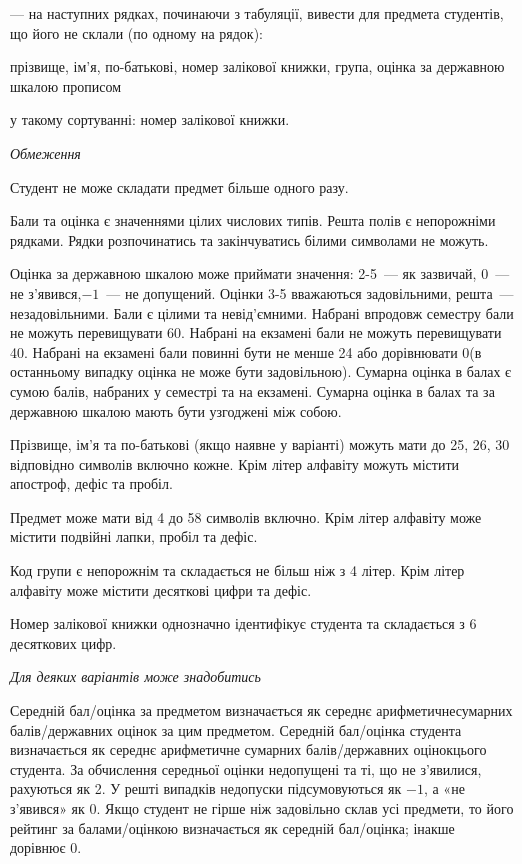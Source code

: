 \documentclass[11pt, ukrainian]{article}
\begin{document}
{\noindent}--- на наступних рядках, починаючи з табуляції, вивести для предмета студентів, що його не склали (по одному на рядок):\par
прізвище, ім’я, по-батькові, номер залікової книжки, група, оцінка за державною шкалою прописом

{\noindent}у такому сортуванні: номер залікової книжки.


\bigskip\textit{Обмеження}

Студент не може складати предмет більше одного разу.

Бали та оцінка є значеннями цілих числових типів. Решта полів є непорожніми рядками.
Рядки розпочинатись та закінчуватись білими символами не можуть.

Оцінка за державною шкалою може приймати значення: 2-5~--- як зазвичай, 0~--- не з’явився,$-1$~--- не допущений. 
Оцінки 3-5 вважаються задовільними, решта~--- незадовільними. 
Бали є цілими та невід’ємними.
Набрані впродовж семестру бали не можуть перевищувати 60. 
Набрані на екзамені бали не можуть перевищувати 40. 
Набрані на екзамені бали повинні бути не менше 24 або дорівнювати 0(в останньому випадку оцінка не може бути задовільною). 
Сумарна оцінка в балах є сумою балів, набраних у семестрі та на екзамені.
Сумарна оцінка в балах та за державною шкалою мають бути узгоджені між собою.

Прізвище, ім’я та по-батькові (якщо наявне у варіанті) можуть мати до 25, 26, 30 відповідно символів включно кожне. 
Крім літер алфавіту можуть містити апостроф, дефіс та пробіл.

Предмет може мати від 4 до 58 символів включно. 
Крім літер алфавіту може містити подвійні лапки, пробіл та дефіс.

Код групи є непорожнім та складається не більш ніж з 4 літер. 
Крім літер алфавіту може містити десяткові цифри та дефіс.


Номер залікової книжки однозначно ідентифікує студента та складається з 6 десяткових цифр. 

\bigskip\textit{Для деяких варіантів може знадобитись}

Середній бал/оцінка за предметом визначається як середнє арифметичнесумарних балів/державних оцінок за цим предметом. 
Середній бал/оцінка студента визначається як середнє арифметичне сумарних балів/державних оцінокцього студента. 
За обчислення середньої оцінки недопущені та ті, що не з’явилися, рахуються як 2.
У решті випадків недопуски підсумовуються як $-1$, а «не з’явився» як 0.
Якщо студент не гірше ніж задовільно склав усі предмети, 
то його рейтинг за балами/оцінкою визначається як середній бал/оцінка; інакше дорівнює 0.
\end{document}

